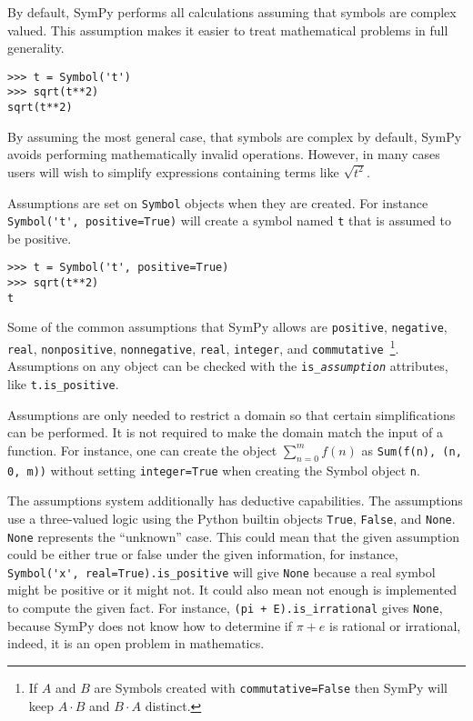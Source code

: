By default, SymPy performs all calculations assuming that symbols are
complex valued. This assumption makes it easier to treat mathematical problems
in full generality.
\begin{verbatim}
>>> t = Symbol('t')
>>> sqrt(t**2)
sqrt(t**2)
\end{verbatim}

By assuming the most general case, that symbols are complex by default, SymPy
avoids performing mathematically invalid operations. However, in many cases
users will wish to simplify expressions containing terms like $\sqrt{t^2}$.

Assumptions are set on \texttt{Symbol} objects when they are created. For
instance \verb|Symbol('t', positive=True)| will create a symbol named
\texttt{t} that is assumed to be positive.
\begin{verbatim}
>>> t = Symbol('t', positive=True)
>>> sqrt(t**2)
t
\end{verbatim}
Some of the common assumptions that SymPy allows are \texttt{positive},
\texttt{negative}, \texttt{real}, \texttt{nonpositive}, \texttt{nonnegative},
\texttt{real}, \texttt{integer}, and \texttt{commutative}~\footnote{If $A$ and
$B$ are Symbols created with \texttt{commutative=False} then SymPy will keep
$A\cdot B$ and $B\cdot A$ distinct.}. Assumptions on any object can be checked with the
\verb|is_|\texttt{\textit{assumption}} attributes, like \verb|t.is_positive|.

Assumptions are only needed to restrict a domain so that certain
simplifications can be performed. It is not required to make the domain match
the input of a function. For instance, one can create the object
$\sum_{n=0}^m f(n)$ as \verb|Sum(f(n), (n, 0, m))| without setting
\texttt{integer=True} when creating the Symbol object \texttt{n}.

The assumptions system additionally has deductive capabilities. The
assumptions use a three-valued logic using the Python builtin objects
\texttt{True}, \texttt{False}, and \texttt{None}. \texttt{None} represents the
``unknown'' case. This could mean that the given assumption could be either
true or false under the given information, for instance,
\verb|Symbol('x', real=True).is_positive| will give \texttt{None} because a real
symbol might be positive or it might not. It could also mean not enough is
implemented to compute the given fact. For instance,
\verb|(pi + E).is_irrational| gives \texttt{None}, because SymPy does not know
how to determine if $\pi + e$ is rational or irrational, indeed, it is an open
problem in mathematics.


